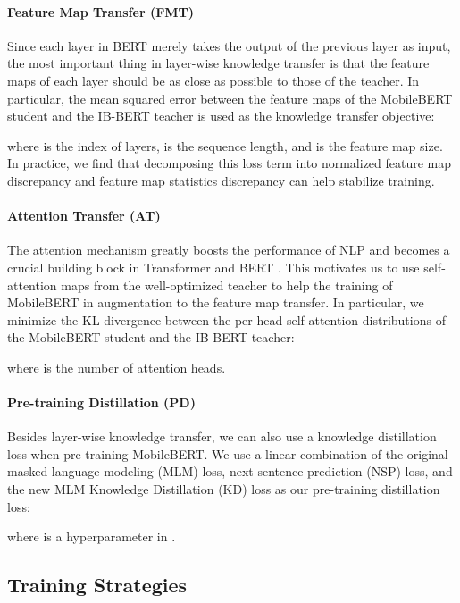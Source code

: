 \documentclass[11pt,a4paper]{article}
\begin{document}
\paragraph{Feature Map Transfer (FMT)}
Since each layer in BERT merely takes the output of the previous layer as input, the most important thing in layer-wise knowledge transfer is that the feature maps of each layer should be as close as possible to those of the teacher. In particular, the mean squared error between the feature maps of the MobileBERT student and the IB-BERT teacher is used as the knowledge transfer objective:
\useshortskip

where  is the index of layers,  is the sequence length, and  is the feature map size.
In practice, we find that decomposing this loss term into normalized feature map discrepancy and feature map statistics discrepancy can help stabilize training.

\paragraph{Attention Transfer (AT)}

The attention mechanism greatly boosts the performance of NLP and becomes a crucial building block in Transformer and BERT \citep{clark2019does,jawahar2019does}.
This motivates us to use self-attention maps from the well-optimized teacher to help the training of MobileBERT in augmentation to the feature map transfer.
In particular, we minimize the KL-divergence between the per-head self-attention distributions of the MobileBERT student and the IB-BERT teacher:

where  is the number of attention heads.

\paragraph{Pre-training Distillation (PD)}

Besides layer-wise knowledge transfer, we can also use a knowledge distillation loss when pre-training MobileBERT.
We use a linear combination of the original masked language modeling (MLM) loss, next sentence prediction (NSP) loss, 
and the new MLM Knowledge Distillation (KD) loss as our pre-training distillation loss:

where  is a hyperparameter in .


\subsection{Training Strategies} \label{sec:bottom}
\end{document}
